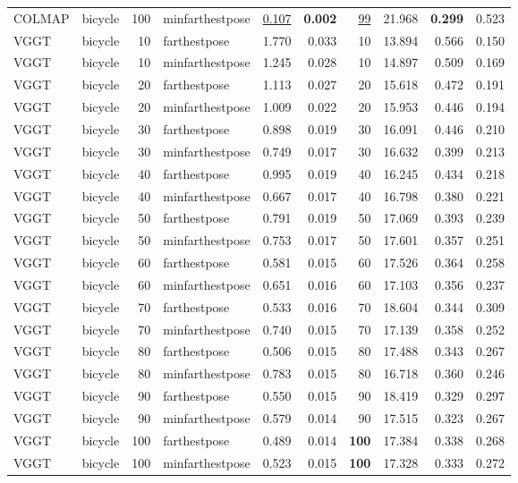 \begin{table}[H]
\begin{tabular}{llrlrrrrrr}
COLMAP & bicycle & 100 & minfarthestpose & \underline{0.107} & \textbf{0.002} & \underline{99} & 21.968 & \textbf{0.299} & 0.523 \\
VGGT & bicycle & 10 & farthestpose & 1.770 & 0.033 & 10 & 13.894 & 0.566 & 0.150 \\
VGGT & bicycle & 10 & minfarthestpose & 1.245 & 0.028 & 10 & 14.897 & 0.509 & 0.169 \\
VGGT & bicycle & 20 & farthestpose & 1.113 & 0.027 & 20 & 15.618 & 0.472 & 0.191 \\
VGGT & bicycle & 20 & minfarthestpose & 1.009 & 0.022 & 20 & 15.953 & 0.446 & 0.194 \\
VGGT & bicycle & 30 & farthestpose & 0.898 & 0.019 & 30 & 16.091 & 0.446 & 0.210 \\
VGGT & bicycle & 30 & minfarthestpose & 0.749 & 0.017 & 30 & 16.632 & 0.399 & 0.213 \\
VGGT & bicycle & 40 & farthestpose & 0.995 & 0.019 & 40 & 16.245 & 0.434 & 0.218 \\
VGGT & bicycle & 40 & minfarthestpose & 0.667 & 0.017 & 40 & 16.798 & 0.380 & 0.221 \\
VGGT & bicycle & 50 & farthestpose & 0.791 & 0.019 & 50 & 17.069 & 0.393 & 0.239 \\
VGGT & bicycle & 50 & minfarthestpose & 0.753 & 0.017 & 50 & 17.601 & 0.357 & 0.251 \\
VGGT & bicycle & 60 & farthestpose & 0.581 & 0.015 & 60 & 17.526 & 0.364 & 0.258 \\
VGGT & bicycle & 60 & minfarthestpose & 0.651 & 0.016 & 60 & 17.103 & 0.356 & 0.237 \\
VGGT & bicycle & 70 & farthestpose & 0.533 & 0.016 & 70 & 18.604 & 0.344 & 0.309 \\
VGGT & bicycle & 70 & minfarthestpose & 0.740 & 0.015 & 70 & 17.139 & 0.358 & 0.252 \\
VGGT & bicycle & 80 & farthestpose & 0.506 & 0.015 & 80 & 17.488 & 0.343 & 0.267 \\
VGGT & bicycle & 80 & minfarthestpose & 0.783 & 0.015 & 80 & 16.718 & 0.360 & 0.246 \\
VGGT & bicycle & 90 & farthestpose & 0.550 & 0.015 & 90 & 18.419 & 0.329 & 0.297 \\
VGGT & bicycle & 90 & minfarthestpose & 0.579 & 0.014 & 90 & 17.515 & 0.323 & 0.267 \\
VGGT & bicycle & 100 & farthestpose & 0.489 & 0.014 & \textbf{100} & 17.384 & 0.338 & 0.268 \\
VGGT & bicycle & 100 & minfarthestpose & 0.523 & 0.015 & \textbf{100} & 17.328 & 0.333 & 0.272 \\

\end{tabular}
\end{table}
